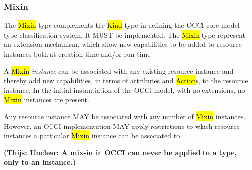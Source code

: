 \documentclass[10pt,a4paper]{article}
\begin{document}
\subsubsection{Mixin}
The \hl{Mixin} type complements the \hl{Kind} type in defining the
OCCI core model type classification system. It MUST be implemented. The \hl{Mixin}
type represent an extension mechanism, which allow new capabilities to
be added to resource instances both at creation-time and/or run-time.

A \hl{Mixin} {\em instance} can be associated with any existing resource
instance and thereby add new capabilities, in terms of attributes and
\hl{Action}s, to the resource instance. In the initial instantiation of the OCCI
model, with no extensions, no \hl{Mixin} instances are present.

Any resource instance MAY be associated with any number of \hl{Mixin}
instances.  However, an OCCI implementation MAY apply restrictions to which
resource instances a particular \hl{Mixin} instance can be associated to.

\textbf{(Thijs: Unclear: A mix-in in OCCI can never be applied to a type, only to an instance.)}
\end{document}
